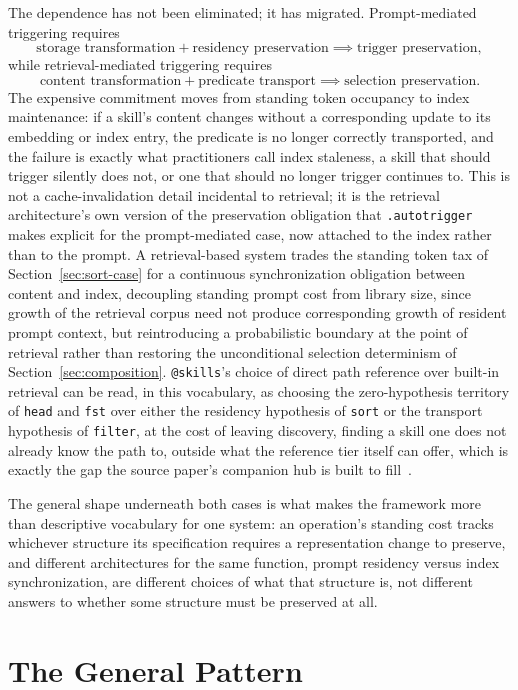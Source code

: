 \documentclass[11pt]{article}
\begin{document}
The dependence has not been eliminated; it has migrated. Prompt-mediated triggering requires
\[
\text{storage transformation} + \text{residency preservation} \implies \text{trigger preservation},
\]
while retrieval-mediated triggering requires
\[
\text{content transformation} + \text{predicate transport} \implies \text{selection preservation}.
\]
The expensive commitment moves from standing token occupancy to index maintenance: if a skill's content changes without a corresponding update to its embedding or index entry, the predicate is no longer correctly transported, and the failure is exactly what practitioners call index staleness, a skill that should trigger silently does not, or one that should no longer trigger continues to. This is not a cache-invalidation detail incidental to retrieval; it is the retrieval architecture's own version of the preservation obligation that \texttt{.autotrigger} makes explicit for the prompt-mediated case, now attached to the index rather than to the prompt. A retrieval-based system trades the standing token tax of Section~\ref{sec:sort-case} for a continuous synchronization obligation between content and index, decoupling standing prompt cost from library size, since growth of the retrieval corpus need not produce corresponding growth of resident prompt context, but reintroducing a probabilistic boundary at the point of retrieval rather than restoring the unconditional selection determinism of Section~\ref{sec:composition}. \texttt{@skills}'s choice of direct path reference over built-in retrieval can be read, in this vocabulary, as choosing the zero-hypothesis territory of \texttt{head} and \texttt{fst} over either the residency hypothesis of \texttt{sort} or the transport hypothesis of \texttt{filter}, at the cost of leaving discovery, finding a skill one does not already know the path to, outside what the reference tier itself can offer, which is exactly the gap the source paper's companion hub is built to fill~\cite{skills2026}.

The general shape underneath both cases is what makes the framework more than descriptive vocabulary for one system: an operation's standing cost tracks whichever structure its specification requires a representation change to preserve, and different architectures for the same function, prompt residency versus index synchronization, are different choices of what that structure is, not different answers to whether some structure must be preserved at all.

\section{The General Pattern}
\end{document}
